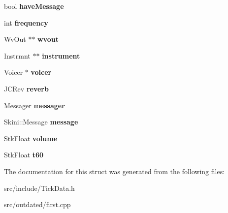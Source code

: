 \begin{DoxyCompactItemize}
\item 
\hypertarget{structTickData_a142d947db0ab6e66f8f912c51a4bafdb}{bool {\bfseries have\-Message}}\label{structTickData_a142d947db0ab6e66f8f912c51a4bafdb}

\item 
\hypertarget{structTickData_ade8d551a52ad93b8f056bf5da813c64c}{int {\bfseries frequency}}\label{structTickData_ade8d551a52ad93b8f056bf5da813c64c}

\item 
\hypertarget{structTickData_a99559444aee6dbc126f650744c5487ec}{Wv\-Out $\ast$$\ast$ {\bfseries wvout}}\label{structTickData_a99559444aee6dbc126f650744c5487ec}

\item 
\hypertarget{structTickData_aa2b6f7f6ad9c886711e9393aca979677}{Instrmnt $\ast$$\ast$ {\bfseries instrument}}\label{structTickData_aa2b6f7f6ad9c886711e9393aca979677}

\item 
\hypertarget{structTickData_ade98160894388bc8534d2003a7a63ffe}{Voicer $\ast$ {\bfseries voicer}}\label{structTickData_ade98160894388bc8534d2003a7a63ffe}

\item 
\hypertarget{structTickData_a3d1563b3668509206700be3e02138827}{J\-C\-Rev {\bfseries reverb}}\label{structTickData_a3d1563b3668509206700be3e02138827}

\item 
\hypertarget{structTickData_a3d0c2a9deef2fd2bd94b3ba8c6b176eb}{Messager {\bfseries messager}}\label{structTickData_a3d0c2a9deef2fd2bd94b3ba8c6b176eb}

\item 
\hypertarget{structTickData_a3061482937dae6c292d4d51400a6143a}{Skini\-::\-Message {\bfseries message}}\label{structTickData_a3061482937dae6c292d4d51400a6143a}

\item 
\hypertarget{structTickData_a6d0680a0bcc9d2c35104ad9721777223}{Stk\-Float {\bfseries volume}}\label{structTickData_a6d0680a0bcc9d2c35104ad9721777223}

\item 
\hypertarget{structTickData_adf8ffe69c6880e995aec842a032ee9fe}{Stk\-Float {\bfseries t60}}\label{structTickData_adf8ffe69c6880e995aec842a032ee9fe}

\end{DoxyCompactItemize}


The documentation for this struct was generated from the following files\-:\begin{DoxyCompactItemize}
\item 
src/include/Tick\-Data.\-h\item 
src/outdated/first.\-cpp\end{DoxyCompactItemize}
